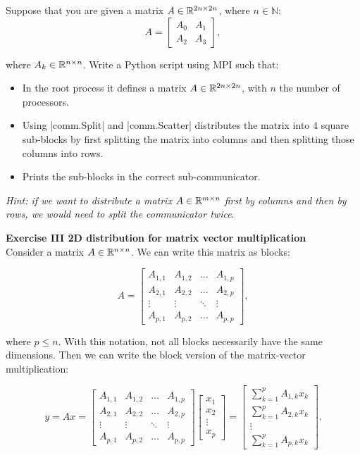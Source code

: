 \documentclass[11pt]{article}
\begin{document}
 Suppose that you are given a matrix $A \in \mathbb{R}^{2n \times 2n}$, where $n \in \mathbb{N}$:
 \[ A = \begin{bmatrix} A_{0} & A_{1} \\ A_{2} & A_{3} \end{bmatrix},\]
 
where $A_{k} \in \mathbb{R}^{n \times n}$. Write a Python script using MPI such that:

\begin{itemize}
   \item In the root process it defines a matrix $A \in \mathbb{R}^{2n \times 2n}$, with $n$ the number of processors. 
   \item Using |comm.Split| and |comm.Scatter| distributes the matrix into $4$ square sub-blocks by first splitting the matrix into columns and then splitting those columns into rows.
   \item Prints the sub-blocks in the correct sub-communicator.
   
   
\end{itemize}

\textit{Hint: if we want to distribute a matrix} $A \in \mathbb{R}^{m \times n}$ \textit{first by columns and then by rows, we would need to split the communicator twice}.

\bigskip

{\bf{Exercise III 2D distribution for matrix vector multiplication}}\\

Consider a matrix $A \in \mathbb{R}^{n \times n}$. We can write this matrix as blocks:

\[ A = \begin{bmatrix} A_{1,1} & A_{1, 2} & \hdots & A_{1,p} \\  A_{2,1} & A_{2, 2} & \hdots & A_{2,p} \\ \vdots & \vdots & \ddots & \vdots \\ A_{p,1} & A_{p, 2} & \hdots & A_{p,p}    \end{bmatrix} , \]

where $p \leq n$. With this notation, not all blocks necessarily have the same dimensions. Then we can write the block version of the matrix-vector multiplication:

\[ y = Ax =  \begin{bmatrix} A_{1,1} & A_{1, 2} & \hdots & A_{1,p} \\  A_{2,1} & A_{2, 2} & \hdots & A_{2,p} \\ \vdots & \vdots & \ddots & \vdots \\ A_{p,1} & A_{p, 2} & \hdots & A_{p,p}    \end{bmatrix} \begin{bmatrix} x_{1} \\ x_{2} \\ \vdots \\ x_{p}  \end{bmatrix} = \begin{bmatrix} \sum_{k = 1}^p A_{1, k} x_k \\  \sum_{k = 1}^p A_{2, k} x_k \\ \vdots \\ \sum_{k = 1}^p A_{p, k} x_k\end{bmatrix}  .  \]
\end{document}
